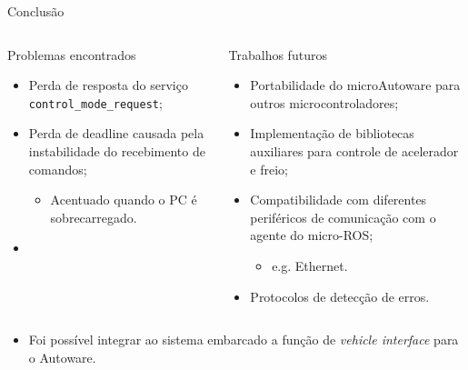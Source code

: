 \documentclass{if-beamer}
\begin{document}
\begin{frame}{Conclusão}
	
	\begin{columns}
		
		\begin{column}{0.435\textwidth}
			
			\begin{block}{Problemas encontrados}
				
				\begin{itemize}
					\item Perda de resposta do serviço \texttt{control\_mode\_request};
					\item Perda de deadline causada pela instabilidade do recebimento de comandos;
					\begin{itemize}
						\item Acentuado quando o PC é sobrecarregado.
					\end{itemize}
					\item 
				\end{itemize}
				
			\end{block}
			
		\end{column}
	
\pause
		
		\begin{column}{0.435\textwidth}
			
			\begin{block}{Trabalhos futuros}
				
				\begin{itemize}
					\item Portabilidade do microAutoware para outros microcontroladores;
					\item Implementação de bibliotecas auxiliares para controle de acelerador e freio;
					\item Compatibilidade com diferentes periféricos de comunicação com o agente do micro-ROS;
					\begin{itemize}
						\item e.g. Ethernet.						
					\end{itemize}
					\item Protocolos de detecção de erros.
				\end{itemize}
				
			\end{block}
			
		\end{column}
		
	\end{columns}

\pause

	\begin{block}{}
		
		\begin{itemize}
			\item Foi possível integrar ao sistema embarcado a função de \textit{vehicle interface} para o Autoware.
			
		\end{itemize}
		
	\end{block}
	
\end{frame}
\end{document}
